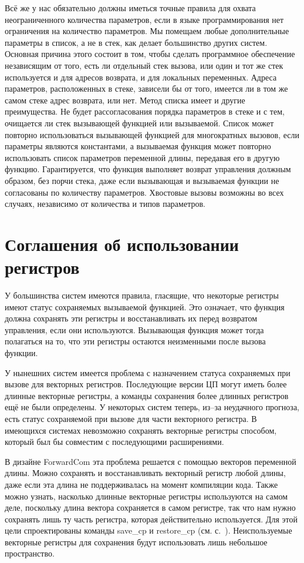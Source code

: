 \documentclass[forwardcom.tex]{subfiles}
\begin{document}
Всё же у нас обязательно должны иметься точные правила для охвата неограниченного количества параметров, если в языке программирования нет ограничения на количество параметров. Мы помещаем любые дополнительные параметры в список, а не в стек, как делает большинство других систем. Основная причина этого состоит в том, чтобы сделать программное обеспечение независящим от того, есть ли отдельный стек вызова, или один и тот же стек используется и для адресов возврата, и для локальных переменных. Адреса параметров, расположенных в стеке, зависели бы от того, имеется ли в том же самом стеке адрес возврата, или нет. Метод списка имеет и другие преимущества. Не будет рассогласования порядка параметров в стеке и с тем, очищается ли стек вызывающей функцией или вызываемой. Список может повторно использоваться вызывающей функцией для многократных вызовов, если параметры являются константами, а вызываемая функция может повторно использовать список параметров переменной длины, передавая его в другую функцию. Гарантируется, что функция выполняет возврат управления должным образом, без порчи стека, даже если вызывающая и вызываемая функции не согласованы по количеству параметров. Хвостовые вызовы возможны во всех случаях, независимо от количества и типов параметров.

\section{Соглашения об использовании регистров} \label{registerUsageConvention}
У большинства систем имеются правила, гласящие, что некоторые регистры имеют статус сохраняемых вызываемой функцией. Это означает, что функция должна сохранять эти регистры и восстанавливать их перед возвратом управления, если они используются. Вызывающая функция может тогда полагаться на то, что эти регистры остаются неизменными после вызова функции.

У нынешних систем имеется проблема с назначением статуса сохраняемых при вызове для векторных регистров. Последующие версии ЦП могут иметь более длинные векторные регистры, а команды сохранения более длинных регистров ещё не были определены. У некоторых систем теперь, из--за неудачного прогноза, есть статус сохраняемой при вызове для части векторного регистра. В имеющихся системах невозможно сохранять векторные регистры способом, который был бы совместим с последующими расширениями.

В дизайне ForwardCom эта проблема решается с помощью векторов переменной длины. Можно сохранять и восстанавливать векторный регистр любой длины, даже если эта длина не поддерживалась на момент компиляции кода. Также можно узнать, насколько длинные векторные регистры используются на самом деле, поскольку длина вектора сохраняется в самом регистре, так что нам нужно сохранять лишь ту часть регистра, которая действительно используется. Для этой цели спроектированы команды save\_cp и restore\_cp (см. с.~\pageref{saveRestoreVectorRegisters}). Неиспользуемые векторные регистры для сохранения будут использовать лишь небольшое пространство.
\end{document}
